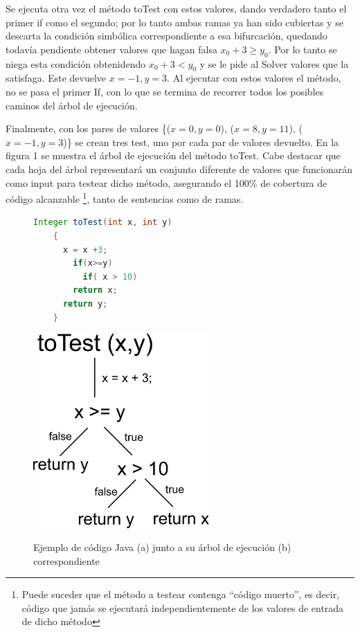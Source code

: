 \documentclass{llncs}
\begin{document}
Se ejecuta otra vez el método toTest con estos valores, dando verdadero tanto el primer if como el segundo; por lo tanto ambas ramas ya han sido cubiertas y se descarta la condición
simbólica correspondiente a esa bifurcación, quedando todavía pendiente obtener valores que hagan falsa $x_0+3 \geq y_0$. Por lo tanto se niega esta condición obtenidendo
$x_0+3 < y_0$ y se le pide al Solver valores que la satisfaga. Este devuelve $x=-1, y=3$. Al ejecutar con estos valores el método, no se pasa el primer If, con lo que se termina de recorrer todos los posibles caminos del árbol de ejecución.

Finalmente, con los pares de valores \{($x=0,y=0$), ($x=8,y=11$), ($x=-1,y=3$)\} se crean tres test, uno por cada par de valores devuelto. En la figura 1 se muestra el árbol
de ejecución del método toTest. Cabe destacar que cada hoja del árbol representará un conjunto diferente de valores que funcionarán como input para testear dicho método,
asegurando el 100\% de cobertura de código alcanzable \footnote{Puede suceder que el método a testear contenga “código muerto”, es decir, código que jamás se ejecutará
independientemente de los valores de entrada de dicho método}, tanto de sentencias como de ramas. 


\begin{figure}[hbt!]
  \centering
    \begin{minipage}[b]{0.5\textwidth}
      \begin{lstlisting}[language=Java]
	Integer toTest(int x, int y)
	{
	  x = x +3;
	    if(x>=y) 
	      if( x > 10) 
		return x;
	  return y;
	}
      \end{lstlisting}
    \end{minipage}
  \begin{minipage}[b]{0.45\textwidth}
    \centering
    \includegraphics[width=0.6\textwidth]{arbolEjecucion}\\
  \end{minipage}
  \caption{Ejemplo de código Java (a) junto a su árbol de ejecución (b) correspondiente}
  \label{arbolEjecucion}
\end{figure}
\end{document}
